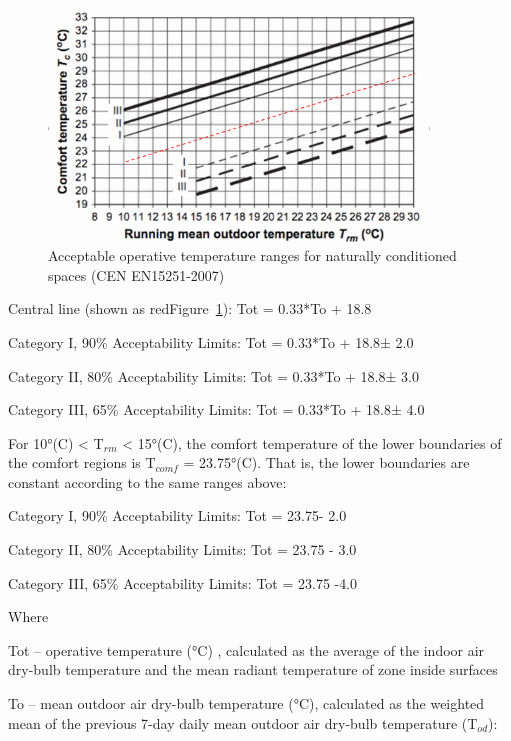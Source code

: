 \begin{figure}[hbtp] %
\centering
\includegraphics[width=0.9\textwidth, height=0.9\textheight, keepaspectratio=true]{media/image6820.png}
\caption{Acceptable operative temperature ranges for naturally conditioned spaces (CEN EN15251-2007) \protect \label{fig:acceptable-operative-temperature-ranges-for-001}}
\end{figure}

Central line (shown as redFigure~\ref{fig:acceptable-operative-temperature-ranges-for-001}): Tot = 0.33*To + 18.8

Category I, 90\% Acceptability Limits: Tot = 0.33*To + 18.8± 2.0

Category II, 80\% Acceptability Limits: Tot = 0.33*To + 18.8± 3.0

Category III, 65\% Acceptability Limits: Tot = 0.33*To + 18.8± 4.0

For 10°(C) \textless{} T\(_{rm}\) \textless{} 15°(C), the comfort temperature of the lower boundaries of the comfort regions is T\(_{comf}\) = 23.75°(C). That is, the lower boundaries are constant according to the same ranges above:

Category I, 90\% Acceptability Limits: Tot = 23.75- 2.0

Category II, 80\% Acceptability Limits: Tot = 23.75 - 3.0

Category III, 65\% Acceptability Limits: Tot = 23.75 -4.0

Where

Tot -- operative temperature (°C) , calculated as the average of the indoor air dry-bulb temperature and the mean radiant temperature of zone inside surfaces

To -- mean outdoor air dry-bulb temperature (°C), calculated as the weighted mean of the previous 7-day daily mean outdoor air dry-bulb temperature (T\(_{od}\)):

